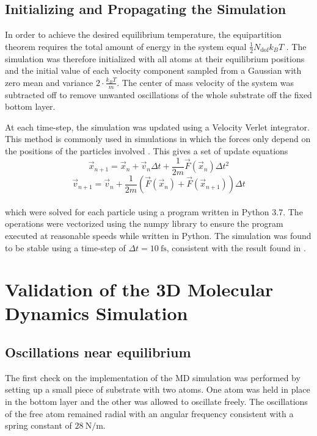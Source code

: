 \subsection{Initializing and Propagating the Simulation}

In order to achieve the desired equilibrium temperature, the equipartition theorem requires the total amount of energy in the system equal $\frac{1}{2}N_{\text{dof}}k_BT$ \cite{Pathria}. The simulation was therefore initialized with all atoms at their equilibrium positions and the initial value of each velocity component sampled from a Gaussian with zero mean and variance $2 \cdot \frac{k_BT}{m}$. The center of mass velocity of the system was subtracted off to remove unwanted oscillations of the whole substrate off the fixed bottom layer.

At each time-step, the simulation was updated using a Velocity Verlet integrator. This method is commonly used in simulations in which the forces only depend on the positions of the particles involved \cite{Omelyan, Choi}. This gives a set of update equations
\\
$$
	\vec{x}_{n+1} = \vec{x}_n + \vec{v}_n \Delta{t} + \frac{1}{2m}\vec{F}\left(\vec{x}_n\right) \Delta{t}^2
$$
\begin{equation}
	\vec{v}_{n+1} = \vec{v}_n + \frac{1}{2m} \left(\vec{F}\left(\vec{x}_n\right) + \vec{F}\left(\vec{x}_{n+1}\right)\right) \Delta{t}
\end{equation}
\\
which were solved for each particle using a program written in Python 3.7. The operations were vectorized using the numpy library \cite{harris2020array} to ensure the program executed at reasonable speeds while written in Python. The simulation was found to be stable using a time-step of $\Delta{t}=\SI{10}{\femto\second}$, consistent with the result found in \cite{ELLIS199499}. 

\section{Validation of the 3D Molecular Dynamics Simulation}

\subsection{Oscillations near equilibrium}

The first check on the implementation of the MD simulation was performed by setting up a small piece of substrate with two atoms. One atom was held in place in the bottom layer and the other was allowed to oscillate freely. The oscillations of the free atom remained radial with an angular frequency consistent with a spring constant of $\SI{28}{\newton\per\metre}$.

